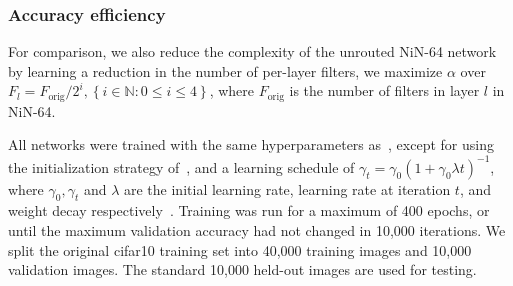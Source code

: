 \documentclass[thesis]{subfiles}
\begin{document}
	\subsubsection{Accuracy \vs efficiency}
	For comparison, we also reduce the complexity of the unrouted NiN-64 network by learning a reduction in the number of per-layer filters, \ie we maximize $\alpha$ over $F_l = F_\textrm{orig}/2^i, \left\{i\in \mathbb{N} : 0 \le i \le 4\right\}$, where $F_\textrm{orig}$ is the number of filters in layer $l$ in NiN-64. 
	
	All networks were trained with the same hyperparameters as~\citep{Lin2013NiN}, 
	except for using the initialization strategy of~\citep{He2015b}, 
	and a learning schedule of $\gamma_t = \gamma_0(1+\gamma_0\lambda t)^{-1}$, where $\gamma_0,\gamma_t$ and $\lambda$ are the initial learning rate, learning rate at iteration $t$, and weight decay respectively~\citep{Bottou2012sgdtricks}. Training was run for a maximum of 400 epochs, or until the maximum validation accuracy had not changed in 10,000 iterations. 
	We split the original \gls{cifar10} training set into 40,000 training images and 
	10,000 validation images. 
	The standard 10,000 held-out images are used for testing.
	
\end{document}
